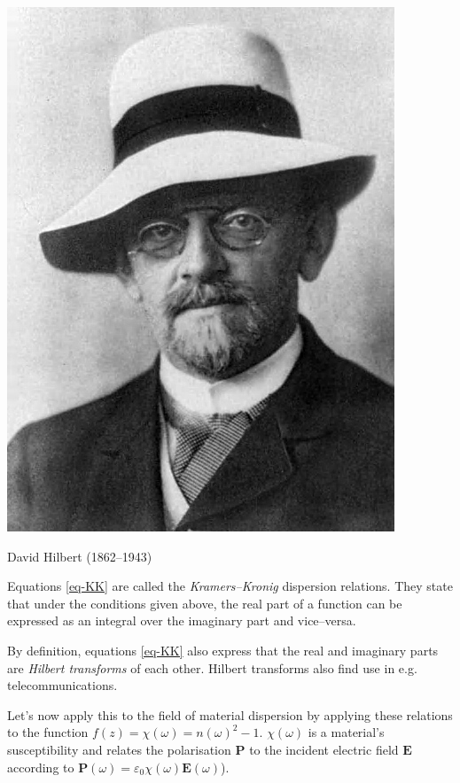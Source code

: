 \begin{marginfigure}[-1.5cm]
  \includegraphics{complex/figures/d_hilbert}
  \caption{David Hilbert (1862–1943)}
\end{marginfigure}

Equations \ref{eq-KK} are called the \emph{Kramers--Kronig} dispersion relations. They state that under the conditions given above, the real part of a function can be expressed as an integral over the imaginary part and vice--versa.

By definition, equations \ref{eq-KK} also express that the real and imaginary parts are \emph{Hilbert transforms} of each other. Hilbert transforms also find use in e.g. telecommunications.

Let's now apply this to the field of material dispersion by applying these relations to the function $f(z) = \chi(\omega) =
n(\omega)^2 -1$. $\chi(\omega)$ is a material's susceptibility and relates the polarisation $\mathbf{P}$ to the incident electric field $\mathbf{E}$ according to $\mathbf{P}(\omega)=\varepsilon_0 \chi(\omega) \mathbf{E}(\omega)$).

